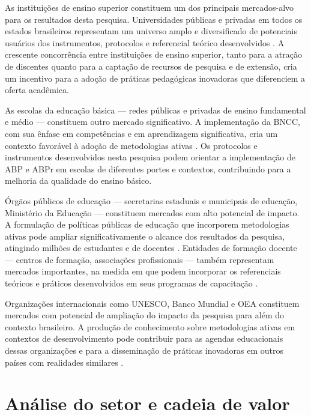 As instituições de ensino superior constituem um dos principais mercados-alvo para os resultados desta pesquisa. Universidades públicas e privadas em todos os estados brasileiros representam um universo amplo e diversificado de potenciais usuários dos instrumentos, protocolos e referencial teórico desenvolvidos \cite{VEIGA2014}. A crescente concorrência entre instituições de ensino superior, tanto para a atração de discentes quanto para a captação de recursos de pesquisa e de extensão, cria um incentivo para a adoção de práticas pedagógicas inovadoras que diferenciem a oferta acadêmica.

As escolas da educação básica — redes públicas e privadas de ensino fundamental e médio — constituem outro mercado significativo. A implementação da BNCC, com sua ênfase em competências e em aprendizagem significativa, cria um contexto favorável à adoção de metodologias ativas \cite{BRASIL2018}. Os protocolos e instrumentos desenvolvidos nesta pesquisa podem orientar a implementação de ABP e ABPr em escolas de diferentes portes e contextos, contribuindo para a melhoria da qualidade do ensino básico.

Órgãos públicos de educação — secretarias estaduais e municipais de educação, Ministério da Educação — constituem mercados com alto potencial de impacto. A formulação de políticas públicas de educação que incorporem metodologias ativas pode ampliar significativamente o alcance dos resultados da pesquisa, atingindo milhões de estudantes e de docentes \cite{MACHADO2025}. Entidades de formação docente — centros de formação, associações profissionais — também representam mercados importantes, na medida em que podem incorporar os referenciais teóricos e práticos desenvolvidos em seus programas de capacitação \cite{CANTANHEDE2026}.

Organizações internacionais como UNESCO, Banco Mundial e OEA constituem mercados com potencial de ampliação do impacto da pesquisa para além do contexto brasileiro. A produção de conhecimento sobre metodologias ativas em contextos de desenvolvimento pode contribuir para as agendas educacionais dessas organizações e para a disseminação de práticas inovadoras em outros países com realidades similares \cite{OECD2019}.

\section{Análise do setor e cadeia de valor}
\label{sec:setor_cadeia}

